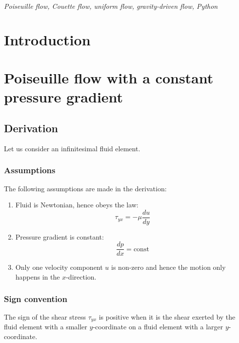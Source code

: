 \documentclass[10pt,twocolumn]{article}
\begin{document}
\textit{Poiseuille flow, Couette flow, uniform flow, gravity-driven flow, Python}

\tableofcontents

\section{Introduction}\label{chap:motivation}



\section{Poiseuille flow with a constant pressure gradient}

\subsection{Derivation}

Let us consider an infinitesimal fluid element.

\subsubsection{Assumptions}

The following assumptions are made in the derivation:

\begin{enumerate}
\item Fluid is Newtonian, hence obeys the law:
\begin{equation}
\tau_{yx} = -\mu \frac{du}{dy}
\end{equation}
\item Pressure gradient is constant:
\begin{equation}
\frac{dp}{dx} = \text{const}
\end{equation}
\item Only one velocity component $u$ is non-zero and hence the motion only happens in the $x$-direction.
\end{enumerate}




\subsubsection{Sign convention}

The sign of the shear stress $\tau_{yx}$ is positive when it is the shear exerted by the fluid element with a smaller $y$-coordinate on a fluid element with a larger $y$-coordinate.
\end{document}
